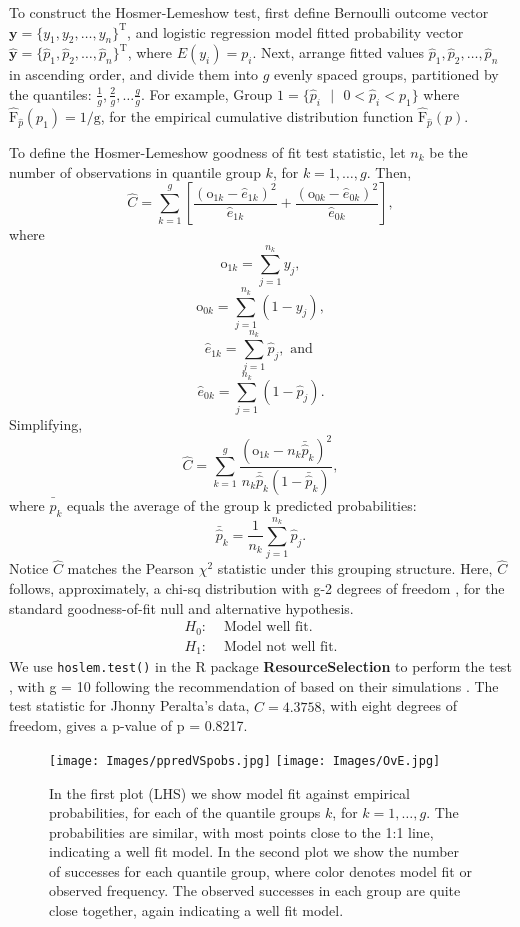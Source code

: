 To construct the Hosmer-Lemeshow test, first define Bernoulli outcome vector $\pmb{y} = \{y_{1}, y_{2}, \dots, y_{n}\}^{\text{T}}$, and logistic regression model fitted probability vector $\hat{\pmb{y}} = \{\hat{p}_{1}, \hat{p}_{2}, \dots, \hat{p}_{n}\}^{\text{T}}$, where $E(y_{i}) = p_{i}$. Next, arrange fitted values $\hat{p}_{1}, \hat{p}_{2}, \dots, \hat{p}_{n}$ in ascending order, and divide them into $g$ evenly spaced groups, partitioned by the quantiles: $\frac{1}{g}, \frac{2}{g}, \dots \frac{g}{g}$. For example, $\text{Group 1} = \{\hat{p}_{i}\text{ }|\text{ }0 < \hat{p}_{i} < p_{1}\}$ where $\hat{\text{F}}_{\hat{p}}(p_{1})=1/\text{g}$, for the empirical cumulative distribution function $\hat{\text{F}}_{\hat{p}}(p)$. 

To define the Hosmer-Lemeshow goodness of fit test statistic, let $n_{k}$ be the number of observations in quantile group $k$, for $k = 1, \dots, g$. Then,
$$ \widehat{C} = \sum_{k=1}^{g} \left[ \frac{(\text{o}_{1k}-\hat{e}_{1k})^{2}}{\hat{e}_{1k}} + \frac{(\text{o}_{0k}-\hat{e}_{0k})^{2}}{\hat{e}_{0k}}  \right], $$
where
$$ \text{o}_{1k} =  \sum_{j=1}^{n_{k}}y_{j},$$
$$ \text{o}_{0k} =  \sum_{j=1}^{n_{k}}(1-y_{j}),$$
$$ \hat{e}_{1k} = \sum_{j=1}^{n_{k}}\hat{p}_{j}, \text{ and }$$
$$ \hat{e}_{0k} = \sum_{j=1}^{n_{k}}(1-\hat{p}_{j}).$$
Simplifying, 
$$ \widehat{C} = \sum_{k=1}^{g} \frac{(\text{o}_{1k}-n_{k}\bar{\hat{p}}_{k})^{2}}{n_{k}\bar{\hat{p}}_{k}(1-\bar{\hat{p}}_{k})},$$
where $\bar{\hat{p}}_{k}$ equals the average of the group k predicted probabilities:
$$\bar{\hat{p}}_{k} = \frac{1}{n_{k}}\sum_{j=1}^{n_{k}}\hat{p}_{j}.$$
Notice $\widehat{C}$ matches the Pearson $\chi^{2}$ statistic under this grouping structure. Here, $\widehat{C}$ follows, approximately, a chi-sq distribution with g-2 degrees of freedom \citep{Hosmer1980}, for the standard goodness-of-fit null and alternative hypothesis.
\begin{align}
H_{0}: & \text{ Model well fit.} \\
H_{1}: & \text{ Model not well fit.}
\end{align}
We use \verb|hoslem.test()| in the R package {\bf ResourceSelection} to perform the test \citep{hoslem}, with g = 10 following the recommendation of \cite{Hosmer2013} based on their simulations \citep{Hosmer1980}. The test statistic for Jhonny Peralta's data, $\widehat{C} = 4.3758$, with eight degrees of freedom, gives a p-value of p = 0.8217. 

  \begin{figure} %
    \centering
    \texttt{[image: Images/ppredVSpobs.jpg]}
    \texttt{[image: Images/OvE.jpg]}
    \caption{In the first plot (LHS) we show model fit against empirical probabilities, for each of the quantile groups $k$, for $k = 1, \dots, g$. The probabilities are similar, with most points close to the 1:1 line, indicating a well fit model. In the second plot we show the number of successes for each quantile group, where color denotes model fit or observed frequency. The observed successes in each group are quite close together, again indicating a well fit model.}
    \label{fig:hoslem}
  \end{figure}

